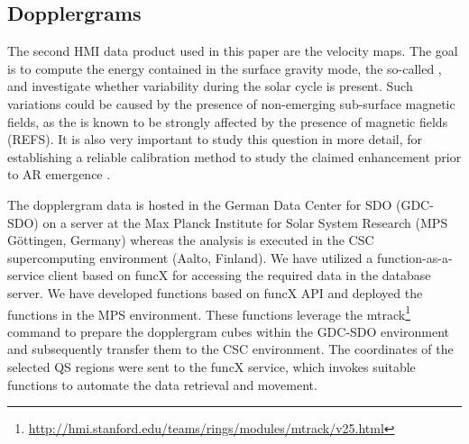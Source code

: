 \documentclass{aa}
\begin{document}

\subsection{Dopplergrams}

The second HMI data product used in this paper are the \los{} velocity maps. The goal is to compute the 
energy contained in the
surface gravity mode, the so-called \fff,
and investigate whether variability during the solar cycle is present. Such variations could be caused by the presence of non-emerging sub-surface magnetic fields, as the \fff is known
to be strongly affected by the presence of magnetic fields (REFS). 
It is also very important to study this question in more detail, for establishing a reliable calibration method to study the claimed 
\fff enhancement prior to AR emergence \cite{SRB16,Waidele22}. 

The dopplergram data is hosted in the German Data Center for SDO (GDC-SDO) on a server at the Max Planck Institute for Solar System Research (MPS Göttingen, Germany) whereas the analysis is executed in the CSC supercomputing environment (Aalto, Finland). We have utilized  a function-as-a-service client based on funcX \cite[]{chard20funcx} for accessing the required data in the database server. We have developed functions based on funcX API and deployed the functions in the MPS environment. These functions leverage the mtrack\footnote{\url{http://hmi.stanford.edu/teams/rings/modules/mtrack/v25.html}} command to prepare the dopplergram cubes within the GDC-SDO environment and subsequently transfer them to the CSC environment. The coordinates of the selected 
QS
regions were sent to the funcX service, which invokes suitable functions to automate the data retrieval and movement.

\end{document}
